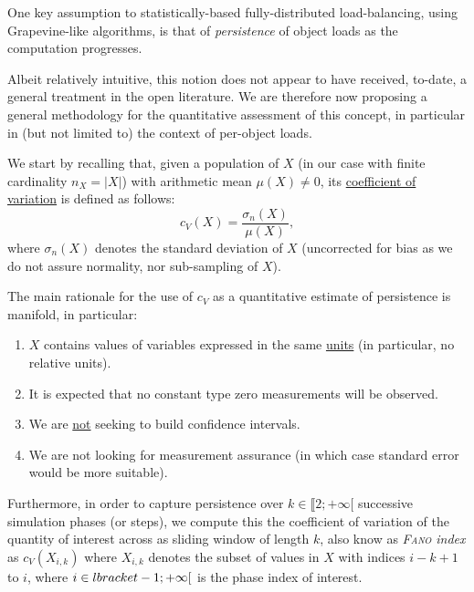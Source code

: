 One key assumption to statistically-based fully-distributed
load-balancing, using Grapevine-like algorithms, is that of
\emph{persistence} of object loads as the computation progresses.

Albeit relatively intuitive, this notion does not appear to have
received, to-date, a general treatment in the open literature.
We are therefore now proposing a general methodology for the
quantitative assessment of this concept, in particular in (but not
limited to) the context of per-object loads.

We start by recalling that,  given a population of $X$ (in our case
with finite cardinality $n_X=\lvert{X}\rvert$) with arithmetic mean
$\mu(X)\neq0$, its \underline{coefficient of variation} is
defined as follows:
\[
c_V(X) = \frac{\sigma_{n}(X)}{\mu(X)},
\]
where $\sigma_{n}(X)$ denotes the standard deviation of $X$
(uncorrected for bias as we do not assure normality, nor 
sub-sampling of $X$). 

The main rationale for the use of $c_V$ as a quantitative estimate of
persistence is manifold, in particular:
\begin{enumerate}
\item
$X$ contains values of variables expressed in the same \underline{units} (in particular, no relative units).
\item
It is expected that no constant type zero measurements will be observed.
\item
We are \underline{not} seeking to build confidence intervals.
\item
We are not looking for measurement assurance (in which case standard
error would be more suitable).
\end{enumerate}

Furthermore, in order to capture persistence over
$k\in\llbracket2;+\infty[$ successive simulation phases (or steps), we
compute this the coefficient of variation of the quantity of interest
across as sliding window of length $k$, also know as
\emph{\textsc{Fano} index} as $c_V(X_{i,k})$ where $X_{i,k}$ denotes
the subset of values in $X$ with indices $i-k+1$ to $i$, where
$i\in\\lbracket-1;+\infty[$ is the phase index of interest.
